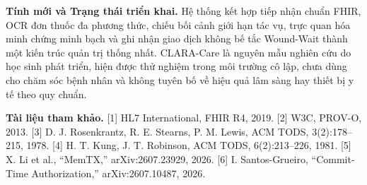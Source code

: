 \documentclass[10pt]{article}
\begin{document}
\textbf{Tính mới và Trạng thái triển khai.} Hệ thống kết hợp tiếp nhận chuẩn FHIR, OCR đơn thuốc đa phương thức, chiếu bối cảnh giới hạn tác vụ, trực quan hóa minh chứng minh bạch và ghi nhận giao dịch không bế tắc Wound-Wait thành một kiến trúc quản trị thống nhất. CLARA-Care là nguyên mẫu nghiên cứu do học sinh phát triển, hiện được thử nghiệm trong môi trường cô lập, chưa dùng cho chăm sóc bệnh nhân và không tuyên bố về hiệu quả lâm sàng hay thiết bị y tế theo quy chuẩn.

\textbf{Tài liệu tham khảo.}
[1] HL7 International, FHIR R4, 2019. [2] W3C, PROV-O, 2013. [3] D. J. Rosenkrantz, R. E. Stearns, P. M. Lewis, ACM TODS, 3(2):178--215, 1978. [4] H. T. Kung, J. T. Robinson, ACM TODS, 6(2):213--226, 1981. [5] X. Li et al., ``MemTX,'' arXiv:2607.23929, 2026. [6] I. Santos-Grueiro, ``Commit-Time Authorization,'' arXiv:2607.10487, 2026.
\end{document}
